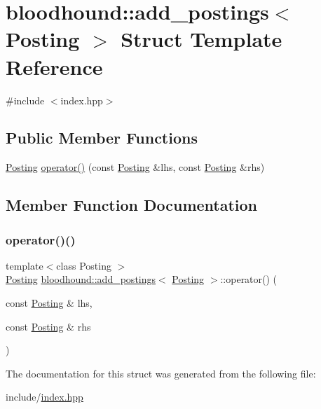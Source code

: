 \hypertarget{structbloodhound_1_1add__postings}{}\section{bloodhound\+:\+:add\+\_\+postings$<$ Posting $>$ Struct Template Reference}
\label{structbloodhound_1_1add__postings}


{\ttfamily \#include $<$index.\+hpp$>$}

\subsection*{Public Member Functions}
\begin{DoxyCompactItemize}
\item 
\hyperlink{structbloodhound_1_1Posting}{Posting} \hyperlink{structbloodhound_1_1add__postings_ab57eba72e4d13d7f3c74d749d51c0f34}{operator()} (const \hyperlink{structbloodhound_1_1Posting}{Posting} \&lhs, const \hyperlink{structbloodhound_1_1Posting}{Posting} \&rhs)
\end{DoxyCompactItemize}


\subsection{Member Function Documentation}
\mbox{\label{structbloodhound_1_1add__postings_ab57eba72e4d13d7f3c74d749d51c0f34}} 
\subsubsection{\texorpdfstring{operator()()}{operator()()}}
{\footnotesize\ttfamily template$<$class Posting $>$ \\
\hyperlink{structbloodhound_1_1Posting}{Posting} \hyperlink{structbloodhound_1_1add__postings}{bloodhound\+::add\+\_\+postings}$<$ \hyperlink{structbloodhound_1_1Posting}{Posting} $>$\+::operator() (\begin{DoxyParamCaption}\item[{const \hyperlink{structbloodhound_1_1Posting}{Posting} \&}]{lhs,  }\item[{const \hyperlink{structbloodhound_1_1Posting}{Posting} \&}]{rhs }\end{DoxyParamCaption})\hspace{0.3cm}{\ttfamily [inline]}}



The documentation for this struct was generated from the following file\+:\begin{DoxyCompactItemize}
\item 
include/\hyperlink{index_8hpp}{index.\+hpp}\end{DoxyCompactItemize}
